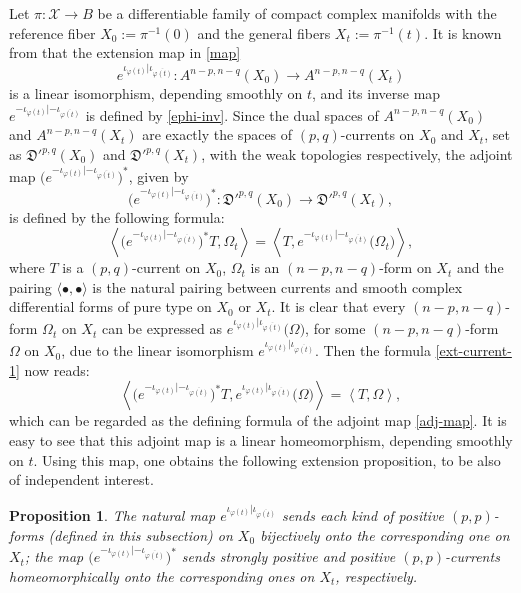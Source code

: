 \documentclass[12pt]{amsart}
\numberwithin{equation}{section}
\newtheorem{proposition}[theorem]{Proposition}
\renewcommand{\1}{\mathds{1}}
\newcommand{\beq}{\begin{equation}}
\newcommand{\eeq}{\end{equation}}
\renewcommand{\>}{\rightarrow}
\begin{document}
Let $\pi: \mathcal{X} \rightarrow B$ be a  differentiable family of compact complex manifolds
with the reference fiber $X_0:= \pi^{-1}(0)$ and the general fibers $X_t:=\pi^{-1}(t)$.
It is known from \cite[Lemma $2.8$]{RZ15} that the extension map in \eqref{map}
\[ e^{\iota_{\varphi(t)}|\iota_{\overline{\varphi(t)}}}:
 A^{n-p,n-q}(X_0)\> A^{n-p,n-q}(X_t) \]
is a linear isomorphism, depending smoothly on $t$, and its inverse map $e^{-\iota_{\varphi(t)}|-\iota_{\overline{\varphi(t)}}}$ is defined by \eqref{ephi-inv}.
Since the dual spaces of $A^{n-p,n-q}(X_0)$ and $A^{n-p,n-q}(X_t)$ are exactly the spaces of $(p,q)$-currents on $X_0$ and $X_t$,
set as $\mathfrak{D}'^{p,q}(X_0)$ and $\mathfrak{D}'^{p,q}(X_t)$, with the weak topologies respectively,
the adjoint map $\big( e^{-\iota_{\varphi(t)}|-\iota_{\overline{\varphi(t)}}} \big)^*$, given by
\begin{equation}\label{adj-map}
 \big( e^{-\iota_{\varphi(t)}|-\iota_{\overline{\varphi(t)}}} \big)^*:
\mathfrak{D}'^{p,q}(X_0) \> \mathfrak{D}'^{p,q}(X_t),
\end{equation}
is defined by the following formula:
\beq\label{ext-current-1}
\left\langle  \big( e^{-\iota_{\varphi(t)}|-\iota_{\overline{\varphi(t)}}} \big)^*T, \Omega_t  \right\rangle
=\left\langle  T, e^{-\iota_{\varphi(t)}|-\iota_{\overline{\varphi(t)}}} \big(\Omega_t\big)  \right\rangle,
\eeq
where $T$ is a $(p,q)$-current on $X_0$, $\Omega_t$ is an $(n-p,n-q)$-form on $X_t$ and the pairing $\langle \bullet,\bullet\rangle$
is the natural pairing between currents and smooth complex differential forms of pure type on $X_0$ or $X_t$.
It is clear that every $(n-p,n-q)$-form $\Omega_t$ on $X_t$ can be expressed as $e^{\iota_{\varphi(t)}|\iota_{\overline{\varphi(t)}}}\big(\Omega\big)$,
for some $(n-p,n-q)$-form $\Omega$ on $X_0$, due to the linear isomorphism $e^{\iota_{\varphi(t)}|\iota_{\overline{\varphi(t)}}}$.
Then the formula \eqref{ext-current-1} now reads:
\beq\label{ext-current-2}
\left\langle \big(e^{-\iota_{\varphi(t)}|-\iota_{\overline{\varphi(t)}}} \big)^*T, e^{\iota_{\varphi(t)}|\iota_{\overline{\varphi(t)}}} \big( \Omega \big) \right\rangle
=\left\langle  T, \Omega  \right\rangle,
\eeq
which can be regarded as the defining formula of the adjoint map \eqref{adj-map}.
It is easy to see that this adjoint map is a linear homeomorphism, depending smoothly on $t$. Using this map,
one obtains the following extension proposition, to be also of independent interest.
\begin{proposition}\label{p-eq}
The natural map $e^{\iota_{\varphi(t)}|\iota_{\overline{\varphi(t)}}}$ sends each kind of positive
$(p,p)$-forms (defined in this subsection) on $X_0$ bijectively onto the corresponding one on $X_t$;
the map $\big( e^{-\iota_{\varphi(t)}|-\iota_{\overline{\varphi(t)}}} \big)^*$ sends strongly positive and positive
$(p,p)$-currents homeomorphically onto the corresponding ones on $X_t$, respectively.
\end{proposition}
\end{document}
